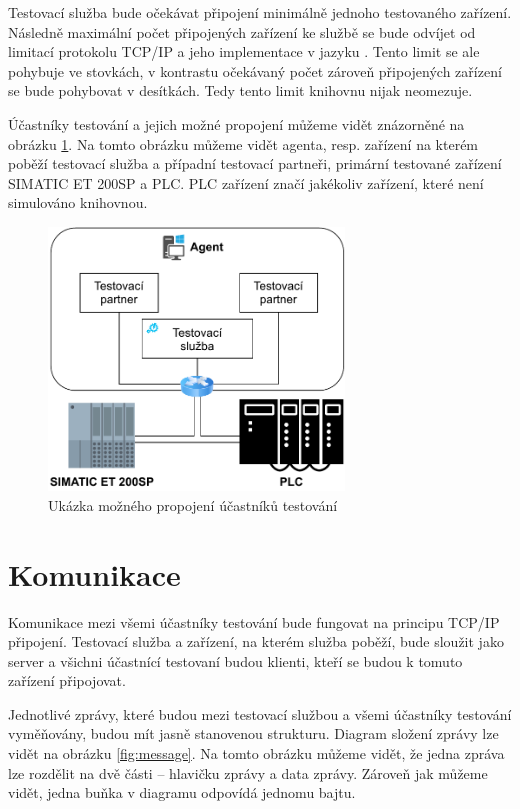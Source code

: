 Testovací služba bude očekávat připojení minimálně jednoho testovaného zařízení. Následně maximální počet připojených zařízení ke službě se bude odvíjet od limitací protokolu TCP/IP a jeho implementace v jazyku \csharp{}. Tento limit se ale pohybuje ve stovkách, v kontrastu očekávaný počet zároveň připojených zařízení se bude pohybovat v desítkách. Tedy tento limit knihovnu nijak neomezuje.

Účastníky testování a jejich možné propojení můžeme vidět znázorněné na obrázku \ref{fig:devicemodel}. Na tomto obrázku můžeme vidět agenta, resp. zařízení na kterém poběží testovací služba a případní testovací partneři, primární testované zařízení SIMATIC ET 200SP a PLC. PLC zařízení značí jakékoliv zařízení, které není simulováno knihovnou.

\begin{figure}[htbp]
    \centering 
    \includegraphics[width=0.7\textwidth]{assets/img/devicemodel.pdf}
    \caption{Ukázka možného propojení účastníků testování}
    \label{fig:devicemodel}
\end{figure}

\section{Komunikace}\label{sec:communication}
Komunikace mezi všemi účastníky testování bude fungovat na principu TCP/IP připojení. Testovací služba a zařízení, na kterém služba poběží, bude sloužit jako server a všichni účastnící testovaní budou klienti, kteří se budou k tomuto zařízení připojovat. 

Jednotlivé zprávy, které budou mezi testovací službou a všemi účastníky testování vyměňovány, budou mít jasně stanovenou strukturu. Diagram složení zprávy lze vidět na obrázku \ref{fig:message}. Na tomto obrázku můžeme vidět, že jedna zpráva lze rozdělit na dvě části -- hlavičku zprávy a data zprávy. Zároveň jak můžeme vidět, jedna buňka v diagramu odpovídá jednomu bajtu. 


